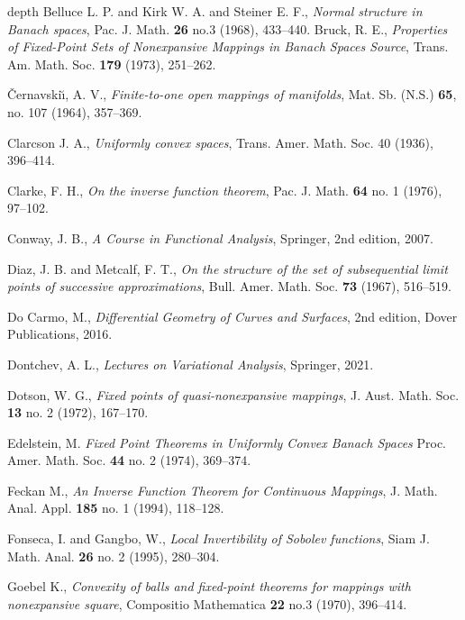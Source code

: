 \documentclass[a4, 12pt,leqno]{amsart}
\theoremstyle{plain}
\theoremstyle{definition}
\theoremstyle{remark}
\numberwithin{equation}{section}
\begin{document}
 

\begin{thebibliography}{depth}
Belluce L. P. and Kirk W. A. and Steiner E. F.,
\textit{Normal structure in Banach spaces},
Pac. J. Math. {\bf 26} no.3 (1968), 433--440.
Bruck, R. E.,
\textit{Properties of Fixed-Point Sets of Nonexpansive Mappings in Banach Spaces
	Source},
Trans. Am. Math. Soc. {\bf 179} (1973), 251--262.


\v{C}ernavski\u{\i}, A. V., \textit{Finite-to-one open mappings of manifolds}, Mat. Sb. (N.S.) {\bf 65}, no. 107 (1964), 357--369.

Clarcson J. A.,
\textit{Uniformly convex spaces},
Trans. Amer. Math. Soc. 40 (1936), 396--414.


Clarke, F. H.,
\textit{On the inverse function theorem},
Pac. J. Math. {\bf 64} no. 1 (1976), 97--102.


Conway, J. B., 
\textit{A Course in Functional Analysis}, Springer, 2nd edition, 2007. 

Diaz, J. B. and Metcalf, F. T., 
\textit{On the structure of the set of subsequential limit points of
	successive approximations},
Bull. Amer. Math. Soc. {\bf 73} (1967), 516--519.

Do Carmo, M.,
\textit{Differential Geometry of Curves and Surfaces}, 2nd edition, Dover Publications, 2016.

Dontchev, A. L.,
\textit{Lectures on Variational Analysis},
Springer, 2021.


Dotson, W. G., 
\textit{Fixed points of quasi-nonexpansive mappings},
J. Aust. Math. Soc. {\bf 13} no. 2 (1972), 167--170.


Edelstein, M.
\textit{Fixed Point Theorems in Uniformly Convex Banach Spaces}
Proc. Amer. Math. Soc. {\bf 44} no. 2 (1974), 369--374.

Feckan M.,
\textit{An Inverse Function Theorem for Continuous Mappings},
J. Math. Anal. Appl. {\bf 185} no. 1 (1994), 118--128.

Fonseca, I. and Gangbo, W.,
\textit{Local Invertibility of Sobolev functions}, 
Siam J. Math. Anal.
{\bf 26} no. 2 (1995), 280--304.

Goebel K.,
\textit{Convexity of balls and fixed-point theorems for mappings with nonexpansive square},
Compositio Mathematica {\bf 22} no.3  (1970), 396--414.


\end{thebibliography}
\end{document}
